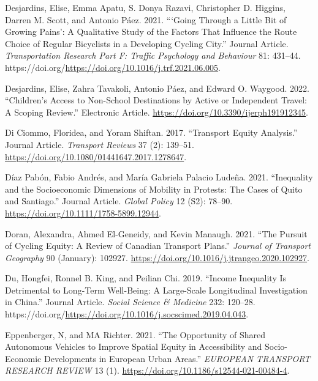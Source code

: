 \documentclass[12pt, oneside]{report}
\newlength{\cslhangindent}
\newlength{\cslentryspacingunit} %
\newenvironment{CSLReferences}[2] %
 {%
  \setlength{\parindent}{0pt}
  \ifodd #1
  \let\oldpar\par
  \def\par{\hangindent=\cslhangindent\oldpar}
  \fi
  \setlength{\parskip}{#2\cslentryspacingunit}
 }%
 {}
\begin{document}
\begin{CSLReferences}{1}{0}
\leavevmode{}%
Desjardins, Elise, Emma Apatu, S. Donya Razavi, Christopher D. Higgins,
Darren M. Scott, and Antonio Páez. 2021. {``{`Going Through a Little Bit
of Growing Pains'}: A Qualitative Study of the Factors That Influence
the Route Choice of Regular Bicyclists in a Developing Cycling City.''}
Journal Article. \emph{Transportation Research Part F: Traffic
Psychology and Behaviour} 81: 431--44.
https://doi.org/\url{https://doi.org/10.1016/j.trf.2021.06.005}.

\leavevmode{}%
Desjardins, Elise, Zahra Tavakoli, Antonio Páez, and Edward O. Waygood.
2022. {``Children's Access to Non-School Destinations by Active or
Independent Travel: A Scoping Review.''} Electronic Article.
\url{https://doi.org/10.3390/ijerph191912345}.

\leavevmode{}%
Di Ciommo, Floridea, and Yoram Shiftan. 2017. {``Transport Equity
Analysis.''} Journal Article. \emph{Transport Reviews} 37 (2): 139--51.
\url{https://doi.org/10.1080/01441647.2017.1278647}.

\leavevmode{}%
Díaz Pabón, Fabio Andrés, and María Gabriela Palacio Ludeña. 2021.
{``Inequality and the Socioeconomic Dimensions of Mobility in Protests:
The Cases of Quito and Santiago.''} Journal Article. \emph{Global
Policy} 12 (S2): 78--90. \url{https://doi.org/10.1111/1758-5899.12944}.

\leavevmode{}%
Doran, Alexandra, Ahmed El-Geneidy, and Kevin Manaugh. 2021. {``The
Pursuit of Cycling Equity: {A} Review of {Canadian} Transport Plans.''}
\emph{Journal of Transport Geography} 90 (January): 102927.
\url{https://doi.org/10.1016/j.jtrangeo.2020.102927}.

\leavevmode{}%
Du, Hongfei, Ronnel B. King, and Peilian Chi. 2019. {``Income Inequality
Is Detrimental to Long-Term Well-Being: A Large-Scale Longitudinal
Investigation in China.''} Journal Article. \emph{Social Science \&
Medicine} 232: 120--28.
https://doi.org/\url{https://doi.org/10.1016/j.socscimed.2019.04.043}.

\leavevmode{}%
Eppenberger, N, and MA Richter. 2021. {``The Opportunity of Shared
Autonomous Vehicles to Improve Spatial Equity in Accessibility and
Socio-Economic Developments in {European} Urban Areas.''} \emph{EUROPEAN
TRANSPORT RESEARCH REVIEW} 13 (1).
\url{https://doi.org/10.1186/s12544-021-00484-4}.


\end{CSLReferences}
\end{document}

